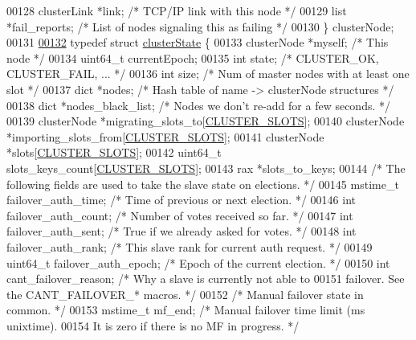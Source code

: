 \begin{DoxyCode}
00128     clusterLink *link;          \textcolor{comment}{/* TCP/IP link with this node */}
00129     list *fail\_reports;         \textcolor{comment}{/* List of nodes signaling this as failing */}
00130 \} clusterNode;
00131 
\hyperlink{structclusterState}{00132} \textcolor{keyword}{typedef} \textcolor{keyword}{struct} \hyperlink{structclusterState}{clusterState} \{
00133     clusterNode *myself;  \textcolor{comment}{/* This node */}
00134     uint64\_t currentEpoch;
00135     \textcolor{keywordtype}{int} state;            \textcolor{comment}{/* CLUSTER\_OK, CLUSTER\_FAIL, ... */}
00136     \textcolor{keywordtype}{int} size;             \textcolor{comment}{/* Num of master nodes with at least one slot */}
00137     dict *nodes;          \textcolor{comment}{/* Hash table of name -> clusterNode structures */}
00138     dict *nodes\_black\_list; \textcolor{comment}{/* Nodes we don't re-add for a few seconds. */}
00139     clusterNode *migrating\_slots\_to[\hyperlink{cluster_8h_aa3e2cb951eebb16725ecc3f5beefd9fd}{CLUSTER\_SLOTS}];
00140     clusterNode *importing\_slots\_from[\hyperlink{cluster_8h_aa3e2cb951eebb16725ecc3f5beefd9fd}{CLUSTER\_SLOTS}];
00141     clusterNode *slots[\hyperlink{cluster_8h_aa3e2cb951eebb16725ecc3f5beefd9fd}{CLUSTER\_SLOTS}];
00142     uint64\_t slots\_keys\_count[\hyperlink{cluster_8h_aa3e2cb951eebb16725ecc3f5beefd9fd}{CLUSTER\_SLOTS}];
00143     rax *slots\_to\_keys;
00144     \textcolor{comment}{/* The following fields are used to take the slave state on elections. */}
00145     mstime\_t failover\_auth\_time; \textcolor{comment}{/* Time of previous or next election. */}
00146     \textcolor{keywordtype}{int} failover\_auth\_count;    \textcolor{comment}{/* Number of votes received so far. */}
00147     \textcolor{keywordtype}{int} failover\_auth\_sent;     \textcolor{comment}{/* True if we already asked for votes. */}
00148     \textcolor{keywordtype}{int} failover\_auth\_rank;     \textcolor{comment}{/* This slave rank for current auth request. */}
00149     uint64\_t failover\_auth\_epoch; \textcolor{comment}{/* Epoch of the current election. */}
00150     \textcolor{keywordtype}{int} cant\_failover\_reason;   \textcolor{comment}{/* Why a slave is currently not able to}
00151 \textcolor{comment}{                                   failover. See the CANT\_FAILOVER\_* macros. */}
00152     \textcolor{comment}{/* Manual failover state in common. */}
00153     mstime\_t mf\_end;            \textcolor{comment}{/* Manual failover time limit (ms unixtime).}
00154 \textcolor{comment}{                                   It is zero if there is no MF in progress. */}

\end{DoxyCode}
